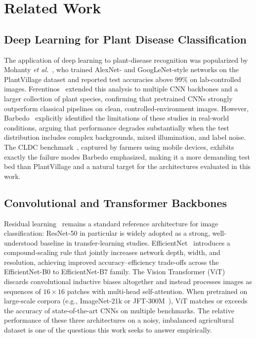 \documentclass[conference]{IEEEtran}
\begin{document}
\section{Related Work}
\label{sec:related}

\subsection{Deep Learning for Plant Disease Classification}
The application of deep learning to plant-disease recognition was popularized by Mohanty \emph{et al.}~\cite{mohanty2016plantdisease}, who trained AlexNet- and GoogLeNet-style networks on the PlantVillage dataset and reported test accuracies above $99\%$ on lab-controlled images. Ferentinos~\cite{ferentinos2018} extended this analysis to multiple CNN backbones and a larger collection of plant species, confirming that pretrained CNNs strongly outperform classical pipelines on clean, controlled-environment images. However, Barbedo~\cite{barbedo2018} explicitly identified the limitations of these studies in real-world conditions, arguing that performance degrades substantially when the test distribution includes complex backgrounds, mixed illumination, and label noise. The CLDC benchmark~\cite{mwebaze2020cassava}, captured by farmers using mobile devices, exhibits exactly the failure modes Barbedo emphasized, making it a more demanding test bed than PlantVillage and a natural target for the architectures evaluated in this work.

\subsection{Convolutional and Transformer Backbones}
Residual learning~\cite{he2016resnet} remains a standard reference architecture for image classification: ResNet-50 in particular is widely adopted as a strong, well-understood baseline in transfer-learning studies. EfficientNet~\cite{tan2019efficientnet} introduces a compound-scaling rule that jointly increases network depth, width, and resolution, achieving improved accuracy--efficiency trade-offs across the EfficientNet-B0 to EfficientNet-B7 family. The Vision Transformer (ViT)~\cite{dosovitskiy2021vit} discards convolutional inductive biases altogether and instead processes images as sequences of $16{\times}16$ patches with multi-head self-attention. When pretrained on large-scale corpora (e.g., ImageNet-21k or JFT-300M~\cite{deng2009imagenet}), ViT matches or exceeds the accuracy of state-of-the-art CNNs on multiple benchmarks. The relative performance of these three architectures on a noisy, imbalanced agricultural dataset is one of the questions this work seeks to answer empirically.
\end{document}
